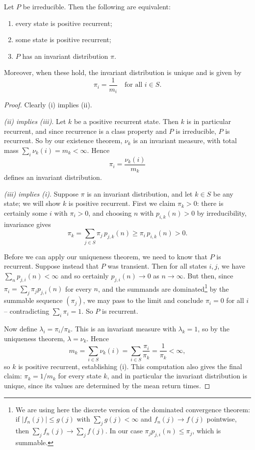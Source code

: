 \begin{theorem}
	Let $P$ be irreducible. Then the following are equivalent:
	\begin{enumerate}[label=(\roman*)]
		\item every state is positive recurrent;
		\item some state is positive recurrent;
		\item $P$ has an invariant distribution $\pi$.
	\end{enumerate}
	Moreover, when these hold, the invariant distribution is unique and is given by
	$$
	\pi_i = \frac{1}{m_i} \quad \text{for all } i \in S.
	$$
\end{theorem}
\begin{proof}
	Clearly (i) implies (ii).

	\emph{(ii) implies (iii)}. Let $k$ be a positive recurrent state. Then $k$ is in particular recurrent, and since recurrence is a class property and $P$ is irreducible, $P$ is recurrent. So by our existence theorem, $\nu_k$ is an invariant measure, with total mass
	$
	\sum_i \nu_k(i) = m_k < \infty.
	$
	Hence
	$$
	\pi_i = \frac{\nu_k(i)}{m_k}
	$$
	defines an invariant distribution.

	\emph{(iii) implies (i)}. Suppose $\pi$ is an invariant distribution, and let $k \in S$ be any state; we will show $k$ is positive recurrent. First we claim $\pi_k > 0$: there is certainly some $i$ with $\pi_i > 0$, and choosing $n$ with $p_{i, k}(n) > 0$ by irreducibility, invariance gives
	$$
	\pi_k = \sum_{j \in S} \pi_j \, p_{j, k}(n) \geq \pi_i \, p_{i, k}(n) > 0.
	$$

	Before we can apply our uniqueness theorem, we need to know that $P$ is recurrent. Suppose instead that $P$ was transient. Then for all states $i, j$, we have $\sum_n p_{j, i}(n) < \infty$ and so certainly $p_{j, i}(n) \rightarrow 0$ as $n \to \infty$. But then, since $\pi_i = \sum_j \pi_j p_{j, i}(n)$ for every $n$, and the summands are dominated\footnote{We are using here the discrete version of the dominated convergence theorem: if $|f_n(j)| \leq g(j)$ with $\sum_j g(j) < \infty$ and $f_n(j) \rightarrow f(j)$ pointwise, then $\sum_j f_n(j) \rightarrow \sum_j f(j)$. In our case $\pi_j p_{j, i}(n) \leq \pi_j$, which is summable.} by the summable sequence $(\pi_j)$, we may pass to the limit and conclude $\pi_i = 0$ for all $i$ -- contradicting $\sum_i \pi_i = 1$. So $P$ is recurrent.

	Now define $\lambda_i = \pi_i / \pi_k$. This is an invariant measure with $\lambda_k = 1$, so by the uniqueness theorem, $\lambda = \nu_k$. Hence
	$$
	m_k = \sum_{i \in S} \nu_k(i) = \sum_{i \in S} \frac{\pi_i}{\pi_k} = \frac{1}{\pi_k} < \infty,
	$$
	so $k$ is positive recurrent, establishing (i). This computation also gives the final claim: $\pi_k = 1/m_k$ for every state $k$, and in particular the invariant distribution is unique, since its values are determined by the mean return times.
\end{proof}

